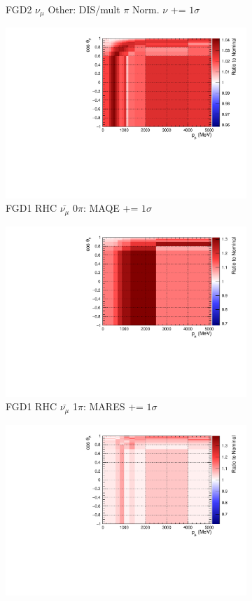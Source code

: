 \begin{figure}
\begin{subfigure}{.32\textwidth}
  \caption{FGD2 $\nu_{\mu}$ Other: DIS/mult $\pi$ Norm. $\nu$ += $1\sigma$}
  \label{fig:sigvar_FGD2_numuCC_other}
\end{subfigure}
\centering
\begin{subfigure}{.32\textwidth}
  \centering
  \includegraphics[width=0.85\linewidth]{figs/sig/FGD1_anti-numuCC_0pi_MAQE_+1sig.pdf}
  \caption{FGD1 RHC $\bar{\nu_{\mu}}$ 0$\pi$: MAQE += $1\sigma$}
  \label{fig:sigvar_FGD1_anti-numuCC_0pi}
\end{subfigure}
\begin{subfigure}{.32\textwidth}
  \centering
  \includegraphics[width=0.85\linewidth]{figs/sig/FGD1_anti-numuCC_1pi_MARES_+1sig.pdf}
  \caption{FGD1 RHC $\bar{\nu_{\mu}}$ 1$\pi$: MARES += $1\sigma$}
  \label{fig:sigvar_FGD1_anti-numuCC_1pi}
\end{subfigure}
\begin{subfigure}{.32\textwidth}
  \centering
  \includegraphics[width=0.85\linewidth]{figs/sig/FGD1_anti-numuCC_other_CC_BY_DIS_+1sig.pdf}

\end{subfigure}
\end{figure}
